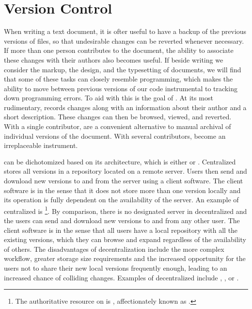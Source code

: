 \documentclass[
  a5paper,10pt,           %
  dvipsnames              %
]{book}
\begin{document}

\section{Version Control}\label{sec:vcs}
When writing a text document, it is ofter useful to have a backup of the
previous versions of files, so that undesirable changes can be reverted whenever
necessary. If more than one person contributes to the document, the ability to
associate these changes with their authors also becomes useful. If beside
writing we consider the markup, the design, and the typesetting of documents, we
will find that some of these tasks can closely resemble programming, which makes
the ability to move between previous versions of our code instrumental to
tracking down programming errors. To aid with this is the goal of .
At its most rudimentary,  records changes along with an information
about their author and a short description. These changes can then be browsed,
viewed, and reverted. With a single contributor,  are a convenient
alternative to manual archival of individual versions of the document. With
several contributors,  become an irreplaceable instrument.

 can be dichotomized based on its architecture, which is either
 or . Centralized  stores
all versions in a repository located on a remote server. Users then send and
download new versions to and from the server using a client software. The client
software is  in the sense that it does not store more than one
version locally and its operation is fully dependent on the availability of the
server. An example of centralized  is \footnote{
  The authoritative resource on  is ,
  affectionately known as .
}. By comparison, there is no designated server in decentralized 
and the users can send and download new versions to and from any other user. The
client software is  in the sense that all users have a local
repository with all the existing versions, which they can browse and expand
regardless of the availability of others. The disadvantages of decentralization
include the more complex workflow, greater storage size requirements and the
increased opportunity for the users not to share their new local versions
frequently enough, leading to an increased chance of colliding changes. Examples
of decentralized  include , , or
.
\end{document}
